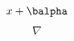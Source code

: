 \documentclass{article}
\newcommand\bx{x}
\begin{document}
{\bmdefine\balpha{\alpha}}
\DeclareBoldMathCommand{\nabla}{\nabla}
\DeclareBoldMathCommand{\nabla}{\nabla}
\[ \bx + \balpha \]
\[ \nabla \]
\end{document}
